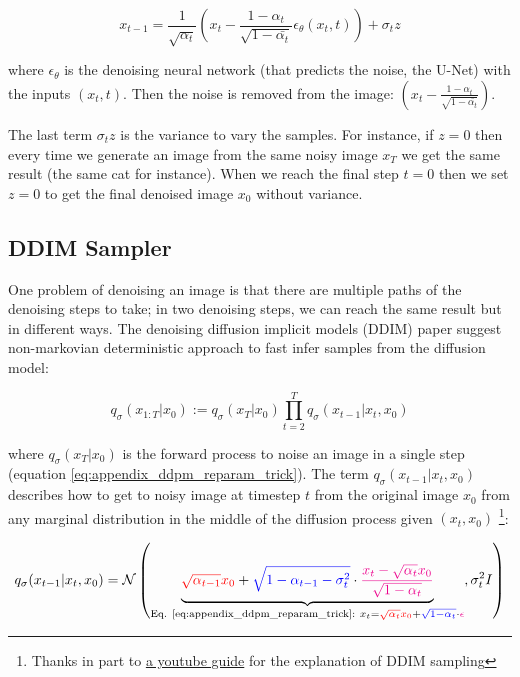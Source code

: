 \[ x_{t-1} = \frac{1}{\sqrt{\alpha_t}} \left( x_t - \frac{1 - \alpha_t}{\sqrt{1 - \bar{\alpha_t}}} \epsilon_\theta (x_t, t) \right) + \sigma_t z \]

where $\epsilon_\theta$ is the denoising neural network (that predicts the noise, the U-Net) with the inputs $(x_t, t)$. Then the noise is removed from the image: $\left( x_t - \frac{1 - \alpha_t}{\sqrt{1 - \bar{\alpha_t}}} \right)$. 

The last term $\sigma_t z$ is the variance to vary the samples. For instance, if $z=0$ then every time we generate an image from the same noisy image $x_T$ we get the same result (the same cat for instance). When we reach the final step $t=0$ then we set $z=0$ to get the final denoised image $x_0$ without variance.







\subsection{DDIM Sampler}

One problem of denoising an image is that there are multiple paths of the denoising steps to take; in two denoising steps, we can reach the same result but in different ways. The denoising diffusion implicit models (DDIM) paper \cite{ddim} suggest non-markovian deterministic approach to fast infer samples from the diffusion model:

\[ q_\sigma (x_{1:T} | x_0) := q_\sigma (x_T | x_0) \prod_{t=2}^{T} q_\sigma (x_{t-1} | x_t, x_0)\]

where $q_\sigma (x_T | x_0)$ is the forward process to noise an image in a single step (equation \ref{eq:appendix_ddpm_reparam_trick}). The term $q_\sigma (x_{t-1} | x_t, x_0)$ describes how to get to noisy image at timestep $t$ from the original image $x_0$ from any marginal distribution in the middle of the diffusion process given $(x_t, x_0)$ \footnote{Thanks in part to \href{https://www.youtube.com/watch?v=r4V0vLhYZIQ&t=686s}{a youtube guide} for the explanation of DDIM sampling}:

\begin{equation}
q_\sigma (x_{t-1} | x_t, x_0) = \mathcal{N} \left( 
\underbrace{
    \textcolor{red}{\sqrt{\alpha_{t-1}} x_0} + \textcolor{blue}{\sqrt{1 - \alpha_{t-1} - \sigma_t^2}} \cdot \textcolor{magenta}{\frac{x_t - \sqrt{\alpha_t} x_0}{\sqrt{1 - \alpha_t}}}
}_{
    \text{Eq. \ref{eq:appendix_ddpm_reparam_trick}:}\ x_t = \textcolor{red}{\sqrt{\alpha_t} x_0} + \textcolor{blue}{\sqrt{1 - \alpha_t}} \cdot \textcolor{magenta}{\epsilon}
}, \sigma_t^2 I 
\right)
\label{eq:appendix_ddim_q}
\end{equation}


